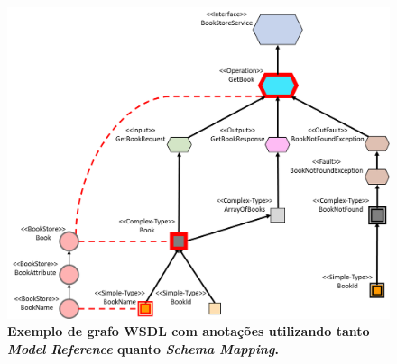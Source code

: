 \begin{figure}[h]
    \includegraphics[scale=0.4]{3-notacao-visual-sawsdl/imagens/grafo-wsdl-anotado-model-reference-e-schema-mapping.png}
    \centering
    \caption[Exemplo de grafo WSDL com anotações utilizando tanto \textit{Model Reference} quanto \textit{Schema Mapping}]{\textbf{Exemplo de grafo WSDL com anotações utilizando tanto \textit{Model Reference} quanto \textit{Schema Mapping}.}}
    \label{fig:grafo-wsdl-anotado-model-reference-e-schema-mapping}
\end{figure}